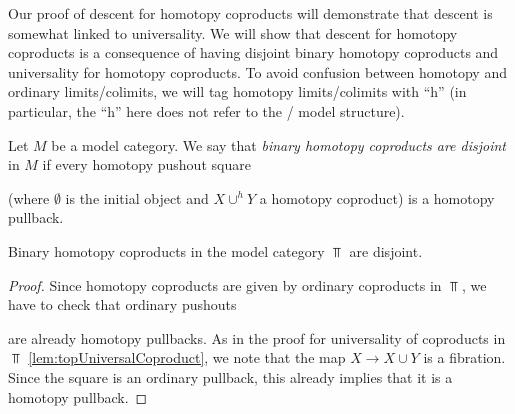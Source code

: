 Our proof of descent for homotopy coproducts will demonstrate that descent is somewhat linked to universality.
We will show that descent for homotopy coproducts is a consequence of having disjoint binary homotopy coproducts and universality for homotopy coproducts.
To avoid confusion between homotopy and ordinary limits/colimits, we will tag homotopy limits/colimits with ``h'' (in particular, the ``h'' here does not refer to the \Strom/ model structure).
\begin{definition}
    Let $M$ be a model category.
    We say that \emph{binary homotopy coproducts are disjoint} in $M$ if every homotopy pushout square
    \begin{center}
    \end{center}
    (where $\emptyset$ is the initial object and $X\cup^h Y$ a homotopy coproduct) is a homotopy pullback.
\end{definition}
\begin{lemma}\label{lem:binCoprodDisjoint}
    Binary homotopy coproducts in the model category $\Top$ are disjoint.
    \begin{proof}
        Since homotopy coproducts are given by ordinary coproducts in $\Top$, we have to check that ordinary pushouts
        \begin{center}
        \end{center}
        are already homotopy pullbacks.
        As in the proof for universality of coproducts in $\Top$ \cref{lem:topUniversalCoproduct}, we note that the map $X\to X\cup Y$ is a fibration.
        Since the square is an ordinary pullback, this already implies that it is a homotopy pullback.
    \end{proof}
\end{lemma}
